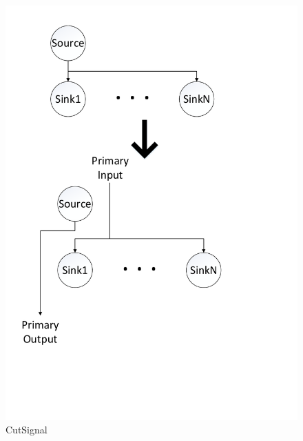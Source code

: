 \documentclass[12pt,final,oneside,a4paper]{dwThesis} %
\begin{document}
   \begin{figure}

      \begin{center}

         \includegraphics[width=\linewidth]{images/CutSignal.pdf}
         \caption{CutSignal} \label{imCutSignal} 
      \end{center}

   \end{figure}
\end{document}
